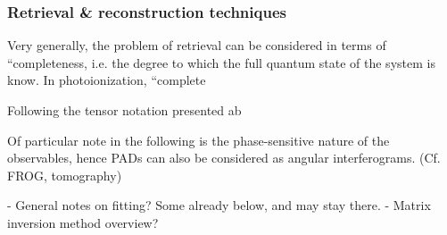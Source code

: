 \subsubsection{Retrieval \& reconstruction techniques}

Very generally, the problem of retrieval can be considered in terms of ``completeness, i.e. the degree to which the full quantum state of the system is know. In photoionization, ``complete

Following the tensor notation presented ab

Of particular note in the following is the phase-sensitive nature of the observables, hence PADs can also be considered as angular interferograms. (Cf. FROG, tomography)

- General notes on fitting? Some already below, and may stay there.
- Matrix inversion method overview?